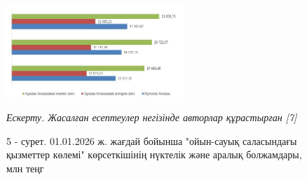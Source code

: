 \begin{figure}[H]
	\centering
	\includegraphics[width=0.6\textwidth]{media/ekon/image6.6}
	\caption*{5 - сурет. 01.01.2026 ж. жағдай бойынша "ойын-сауық саласындағы
  қызметтер көлемі" көрсеткішінің нүктелік және аралық болжамдары, млн
  теңг}
  \emph{Ескерту. Жасалған есептеулер негізінде авторлар құрастырған {[}7{]}}
\end{figure}


